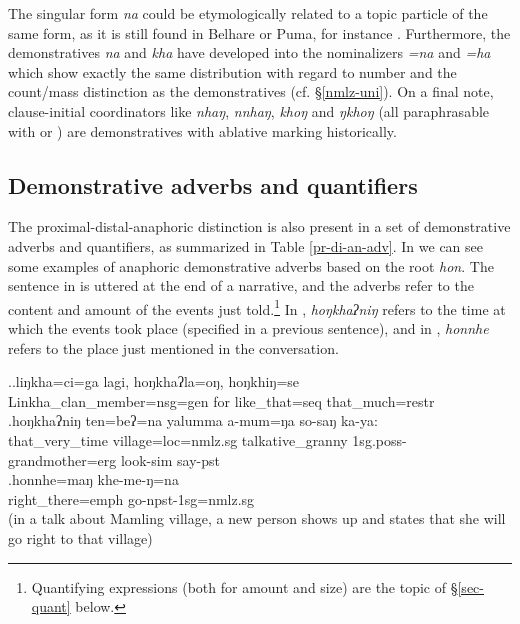 The singular form  \emph{na} could be etymologically related to a topic particle of the same form, as it is still found in Belhare or Puma, for instance \citep[559]{Bickel2003Belhare, Bickeletal2009Puma}. Furthermore, the demonstratives \emph{na} and \emph{kha} have  developed into the nominalizers \emph{=na} and \emph{=ha} which show exactly the same distribution with regard to number and the count/mass distinction as the demonstratives (cf. §\ref{nmlz-uni}). On a final note, clause-initial coordinators like \emph{nhaŋ}, \emph{nnhaŋ}, \emph{khoŋ} and \emph{ŋkhoŋ} (all paraphrasable with  or ) are demonstratives with ablative marking historically.


\subsection{Demonstrative adverbs and quantifiers}\label{dem-set1rel}

The proximal-distal-anaphoric distinction is also present in a set of demonstrative adverbs and quantifiers, as summarized in Table \ref{pr-di-an-adv}. In \Next we can see some examples of anaphoric demonstrative adverbs based on the root \emph{hon}. The sentence in \Next[a] is uttered at the end of a narrative, and the adverbs refer to the content and amount of the events just told.\footnote{Quantifying expressions (both for amount and size) are the topic of §\ref{sec-quant} below.}  In \Next[b], \emph{hoŋkhaʔniŋ} refers to the time at which the events took place (specified in a previous sentence), and in \Next[c], \emph{honnhe} refers to the place just mentioned in the conversation.

\ex.\ag.liŋkha=ci=ga         lagi, hoŋkhaʔla=oŋ,    hoŋkhiŋ=se\\
Linkha\_clan\_member{\sc =nsg=gen} for like\_that{\sc =seq} that\_much{\sc =restr}\\
 
\bg.hoŋkhaʔniŋ ten=beʔ=na               yalumma          a-mum=ŋa   so-saŋ    ka-ya:\\
that\_very\_time village{\sc =loc=nmlz.sg} talkative\_granny  {\sc 1sg.poss-}grandmother{\sc =erg} look{\sc -sim} say{\sc [3sg]-pst}\\
  
\bg.honnhe=maŋ khe-me-ŋ=na\\
right\_there{\sc =emph} go{\sc -npst-1sg=nmlz.sg}\\
 (in a talk about Mamling village, a new person shows up and states that she will go right to that village)	
	
